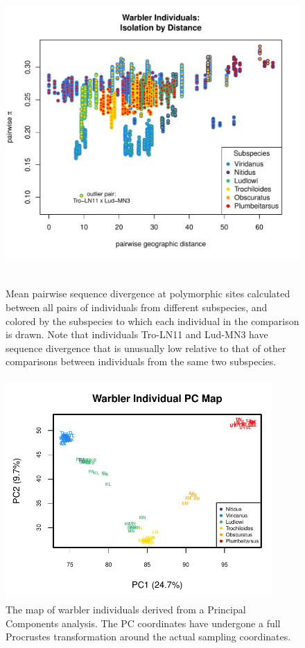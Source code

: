 \documentclass[10pt,letterpaper]{article}
\begin{document}
\begin{figure}
\centering
	{\includegraphics[width=5in,height=4.3in]{../figs/warblers/warb_ind_pairwise_pi.pdf}}
	\caption{Mean pairwise sequence divergence at polymorphic sites calculated between all pairs of individuals from different subspecies, and colored by the subspecies to which each individual in the comparison is drawn.  Note that individuals Tro-LN11 and Lud-MN3 have sequence divergence that is unusually low relative to that of other comparisons between individuals from the same two subspecies.}\label{sfig:warb_ind_pwp}
\end{figure}

\begin{figure}
	\centering
	\includegraphics[width=4in,height=3.33in]{../figs/warblers/warb_ind_PC_map.pdf}
	\caption{The map of warbler individuals derived from a Principal Components analysis.  The PC coordinates have undergone a full Procrustes transformation around the actual sampling coordinates.}
	\label{sfig:warb_ind_PC_map}
\end{figure}
\end{document}
